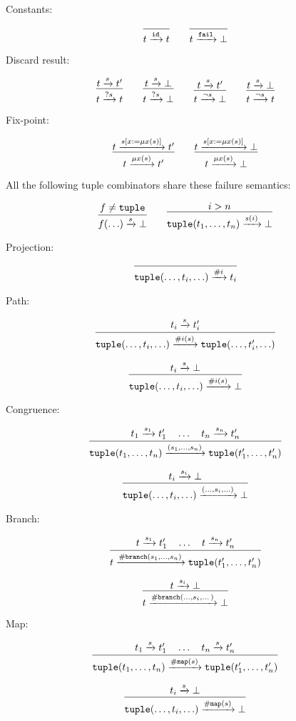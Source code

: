 Constants:

\[
\infer{t \arr{\mathtt{id}} t}{}
\qquad
\infer{t \arr{\mathtt{fail}} \bot}{}
\]

Discard result:

\[
\infer{t \arr{?s} t}{t \arr{s} t'}
\qquad 
\infer{t \arr{?s} \bot}{t \arr{s} \bot}
\qquad
\infer{t \arr{\lnot s} \bot}{t \arr{s} t'}
\qquad 
\infer{t \arr{\lnot s} t}{t \arr{s} \bot}
\]

Fix-point:

\[
\infer{t \arr{\mu x(s)} t'}{t \arr{s[x := \mu x(s)]} t'}
\qquad 
\infer{t \arr{\mu x(s)} \bot}{t \arr{s[x := \mu x(s)]} \bot}
\]

All the following tuple combinators share these failure semantics:

\[
\infer{f(\ldots) \arr{s} \bot}
{f \neq \mathtt{tuple}}
\qquad
\infer{\mathtt{tuple}(t_1,\ldots,t_n) \arr{s(i)} \bot}{i > n}
\]

Projection:

\[
\infer{\mathtt{tuple}(\ldots,t_i,\ldots) \arr{\#i} t_i}{}
\]

Path:

\[
\infer{\mathtt{tuple}(\ldots,t_i,\ldots) \arr{\#i(s)} 
\mathtt{tuple}(\ldots,t_i',\ldots)}
{t_i \arr{s} t_i'}
\]

\[
\infer{\mathtt{tuple}(\ldots,t_i,\ldots) \arr{\#i(s)} \bot}
{t_i \arr{s} \bot}
\]

Congruence:

\[
\infer{
\mathtt{tuple}(t_1,\ldots,t_n)
\arr{(s_1,\ldots,s_n)}
\mathtt{tuple}(t_1',\ldots,t_n') }
{t_1 \arr{s_1} t_1' \quad \ldots \quad t_n \arr{s_n} t_n'}
\]

\[
\infer{
\mathtt{tuple}(\ldots,t_i,\ldots)
\arr{(\ldots,s_i,\ldots)}
\bot}
{t_i \arr{s_i} \bot}
\]

Branch:

\[
\infer{
  t \arr{\mathtt{\#branch}(s_1,\ldots,s_n)}
  \mathtt{tuple}(t_1',\ldots,t_n')
}{t \arr{s_1} t_1' \quad \ldots \quad t \arr{s_n} t_n'}
\]

\[
\infer
{t \arr{\mathtt{\#branch}(\ldots,s_i,\dots)} \bot}
{t \arr{s_i} \bot}
\]

Map:

\[
\infer{
  \mathtt{tuple}(t_1,\ldots,t_n)
  \arr{\mathtt{\#map}(s)}
  \mathtt{tuple}(t_1',\ldots,t_n')
}{t_1 \arr{s} t_1' \quad \ldots \quad t_n \arr{s} t_n'}
\]

\[
\infer
{\mathtt{tuple}(\ldots,t_i,\ldots) \arr{\mathtt{\#map}(s)} \bot}
{t_i \arr{s} \bot}
\]

